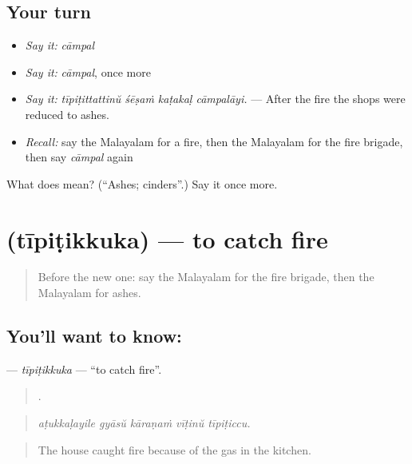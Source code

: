 \subsection*{Your turn}
\begin{itemize}
\raggedright
  \item \emph{Say it:} \emph{cāmpal}
  \item \emph{Say it:} \emph{cāmpal}, once more
  \item \emph{Say it:} \emph{tīpiṭittattinŭ śēṣaṁ kaṭakaḷ cāmpalāyi.} — After the fire the shops were reduced to ashes.
  \item \emph{Recall:} say the Malayalam for a fire, then the Malayalam for the fire brigade, then say \emph{cāmpal} again
\end{itemize}

\begin{tcolorbox}[breakable,colback=teal!4,colframe=teal!35!black,title={Before you move on}]
What does  mean? (\textquotedblleft{}Ashes; cinders\textquotedblright{}.) Say it once more.
\end{tcolorbox}
\section[\texorpdfstring{\ml{തീപിടിക്കുക} (tīpiṭikkuka)}{തീപിടിക്കുക (tīpiṭikkuka)}]{ (tīpiṭikkuka) — to catch fire}

\label{lesson:ML-C362-tipitikkuka}



\begin{quote}
Before the new one: say the Malayalam for the fire brigade, then the Malayalam for ashes.
\end{quote}

\subsection*{You'll want to know: }
\textbf{} — \emph{tīpiṭikkuka} — \textquotedblleft{}to catch fire\textquotedblright{}.

\begin{quote}
    .
\end{quote}

\begin{quote}
\emph{aṭukkaḷayile gyāsŭ kāraṇaṁ vīṭinŭ tīpiṭiccu.}
\end{quote}

\begin{quote}
The house caught fire because of the gas in the kitchen.
\end{quote}

